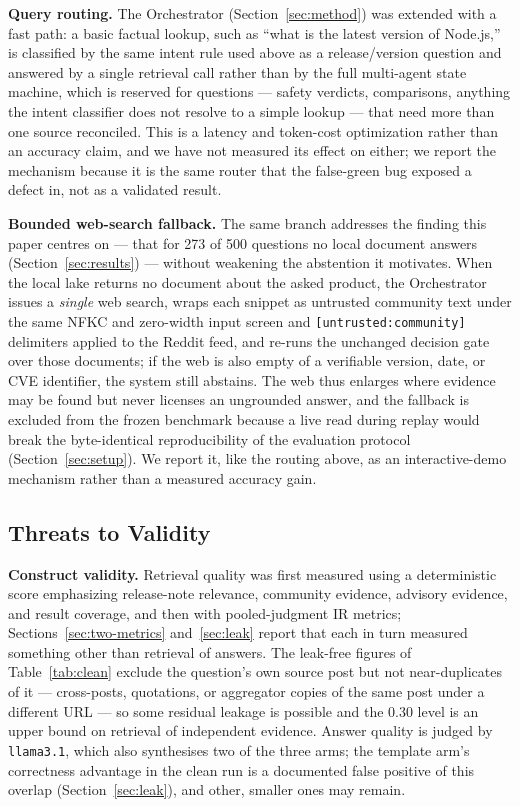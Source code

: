\documentclass[acmsmall,review,anonymous,screen]{acmart}
\begin{document}
\textbf{Query routing.} The Orchestrator (Section~\ref{sec:method}) was
extended with a fast path: a basic factual lookup, such as ``what is the
latest version of Node.js,'' is classified by the same intent rule used
above as a release/version question and answered by a single retrieval call
rather than by the full multi-agent state machine, which is reserved for
questions --- safety verdicts, comparisons, anything the intent classifier
does not resolve to a simple lookup --- that need more than one source
reconciled. This is a latency and token-cost optimization rather than an
accuracy claim, and we have not measured its effect on either; we report the
mechanism because it is the same router that the false-green bug exposed a
defect in, not as a validated result.

\textbf{Bounded web-search fallback.} The same branch addresses the finding
this paper centres on --- that for 273 of 500 questions no local document
answers (Section~\ref{sec:results}) --- without weakening the abstention it
motivates. When the local lake returns no document about the asked product, the
Orchestrator issues a \emph{single} web search, wraps each snippet as untrusted
community text under the same NFKC and zero-width input screen and
\texttt{[untrusted:community]} delimiters applied to the Reddit feed, and
re-runs the unchanged decision gate over those documents; if the web is also
empty of a verifiable version, date, or CVE identifier, the system still
abstains. The web thus enlarges where evidence may be found but never licenses
an ungrounded answer, and the fallback is excluded from the frozen benchmark
because a live read during replay would break the byte-identical
reproducibility of the evaluation protocol (Section~\ref{sec:setup}). We report
it, like the routing above, as an interactive-demo mechanism rather than a
measured accuracy gain.

\subsection{Threats to Validity}\label{sec:threats}

\textbf{Construct validity.}
Retrieval quality was first measured using a deterministic score emphasizing
release-note relevance, community evidence, advisory evidence, and result
coverage, and then with pooled-judgment IR metrics; Sections~\ref{sec:two-metrics}
and~\ref{sec:leak} report that each in turn measured something other than
retrieval of answers. The leak-free figures of Table~\ref{tab:clean} exclude the
question's own source post but not near-duplicates of it --- cross-posts,
quotations, or aggregator copies of the same post under a different URL --- so
some residual leakage is possible and the 0.30 level is an upper bound on
retrieval of independent evidence. Answer quality is judged by \texttt{llama3.1},
which also synthesises two of the three arms; the template arm's correctness
advantage in the clean run is a documented false positive of this overlap
(Section~\ref{sec:leak}), and other, smaller ones may remain.
\end{document}

